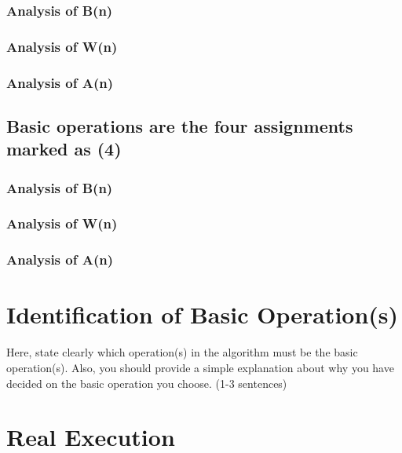 \documentclass[11pt, oneside, a4paper]{article}
\begin{document}
	\subsubsection{Analysis of B(n)}

	\subsubsection{Analysis of W(n)}

        \subsubsection{Analysis of A(n)}

	\subsection{Basic operations are the four assignments marked as (4)}

	\subsubsection{Analysis of B(n)}

	\subsubsection{Analysis of W(n)}
	
        \subsubsection{Analysis of A(n)}

	\section{Identification of Basic Operation(s)}

	Here, state clearly which operation(s) in the algorithm must be the basic operation(s). Also, you should provide a simple explanation about why you have decided on the basic operation you choose. (1-3 sentences)

	\section{Real Execution}
\end{document}
